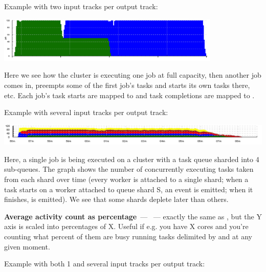 \documentclass{article}
\begin{document}
\pagebreak
Example with two input tracks per output track: 

\centerline{\includegraphics[width=0.8\textwidth]{pics/tplot/tplot-preemption.png}}

Here we see how the cluster is executing one job at full capacity, then another job comes in, preempts some of the first job's tasks and starts its own tasks there, etc. Each job's task starts are mapped to  and task completions are mapped to .

Example with several input tracks per output track: 

\centerline{\includegraphics[width=\textwidth]{pics/tplot/tplot-4rmq.png}}

Here, a single job is being executed on a cluster with a task queue sharded into 4 sub-queues. The graph shows the number of concurrently executing tasks taken from each shard over time (every worker is attached to a single shard; when a task starts on a worker attached to queue shard S, an event  is emitted; when it finishes,  is emitted). We see that some shards deplete later than others.


\pagebreak
\noindent
\textbf{Average activity count as percentage}~--- ~--- exactly the same as , but the Y axis is scaled into percentages of X. Useful if e.g. you have X cores and you're counting what percent of them are busy running tasks delimited by \hlverb{>} and \hlverb{<} at any given moment.

Example with both 1 and several input tracks per output track: 
\end{document}
